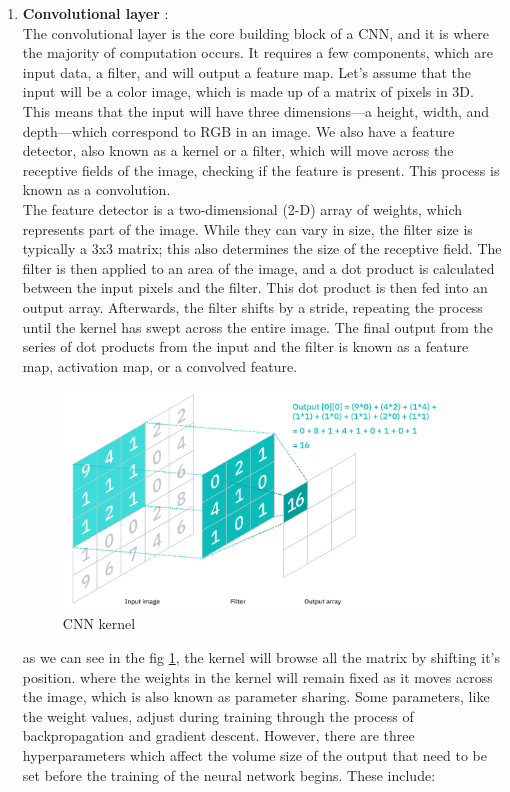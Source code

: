     
\begin{enumerate}
    \item \textbf{Convolutional layer} : \\
        The convolutional layer is the core building block of a CNN, and it is where the majority of computation occurs. It requires a few components, which are input data, a filter, and will output a feature map. Let’s assume that the input will be a color image, which is made up of a matrix of pixels in 3D. This means that the input will have three dimensions—a height, width, and depth—which correspond to RGB in an image. We also have a feature detector, also known as a kernel or a filter, which will move across the receptive fields of the image, checking if the feature is present. This process is known as a convolution. \\
        The feature detector is a two-dimensional (2-D) array of weights, which represents part of the image. While they can vary in size, the filter size is typically a 3x3 matrix; this also determines the size of the receptive field. The filter is then applied to an area of the image, and a dot product is calculated between the input pixels and the filter. This dot product is then fed into an output array. Afterwards, the filter shifts by a stride, repeating the process until the kernel has swept across the entire image. The final output from the series of dot products from the input and the filter is known as a feature map, activation map, or a convolved feature.
        \begin{figure}[H]
            \centering
            \includegraphics[width=10cm]{../images/CNN-kernel.png}
            \caption{CNN kernel}
            \label{fig:CNN-kernel}
        \end{figure}
        as we can see in the fig \ref{fig:CNN-kernel}, the kernel will browse all the matrix by shifting it's position. where the weights in the kernel will remain fixed as it moves across the image, which is also known as parameter sharing. Some parameters, like the weight values, adjust during training through the process of backpropagation and gradient descent. However, there are three hyperparameters which affect the volume size of the output that need to be set before the training of the neural network begins. These include:

\end{enumerate}

